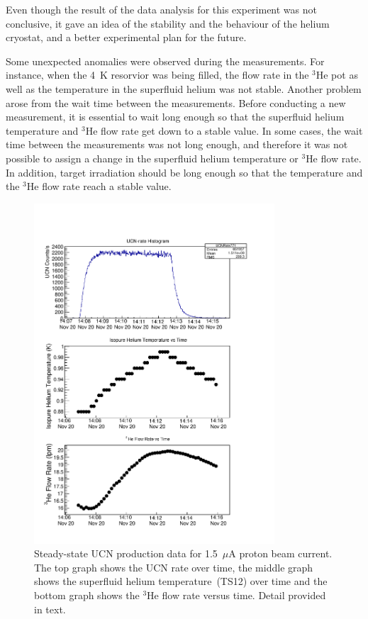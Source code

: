 Even though the result of the data analysis for this experiment was
not conclusive, it gave an idea of the stability and the behaviour of
the helium cryostat, and a better experimental plan for the future.

Some unexpected anomalies were observed during the measurements. For
instance, when the 4~K resorvior was being filled, the flow rate in
the $^3$He pot as well as the temperature in the superfluid helium was
not stable. Another problem arose from the wait time between the
measurements. Before conducting a new measurement, it is essential to
wait long enough so that the superfluid helium temperature and $^3$He
flow rate get down to a stable value. In some cases, the wait time
between the measurements was not long enough, and therefore it was not
possible to assign a change in the superfluid helium temperature or
$^3$He flow rate. In addition, target irradiation should be long
enough so that the temperature and the $^3$He flow rate reach a stable
value.


\begin{figure}[h!]
  \centering \includegraphics[width=0.8\textwidth]{problemrun.pdf}
  \caption{Steady-state UCN production data for 1.5~$\mu$A proton beam
    current. The top graph shows the UCN rate over time, the middle
    graph shows the superfluid helium temperature~(TS12) over time and
    the bottom graph shows the $^3$He flow rate versus time. Detail
    provided in text.}
\label{fig:problemrun}
\end{figure}


